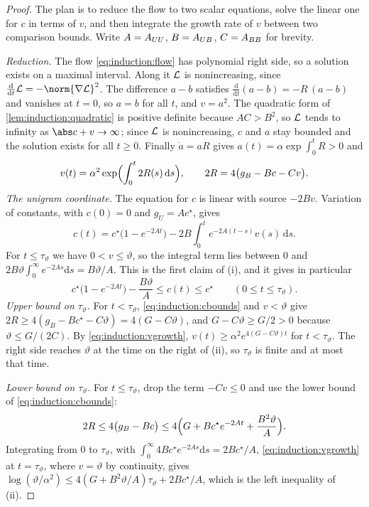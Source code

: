 \begin{refsection}
\begin{proof}
The plan is to reduce the flow to two scalar equations, solve the linear one for $c$ in terms of $v$, and then integrate the growth rate of $v$ between two comparison bounds. Write $A=A_{UU}$, $B=A_{UB}$, $C=A_{BB}$ for brevity.

\emph{Reduction.} The flow \eqref{eq:induction:flow} has polynomial right side, so a solution exists on a maximal interval. Along it $\mathcal{L}$ is nonincreasing, since $\frac{\mathrm d}{\mathrm dt}\Loss=-\norm{\nabla\Loss}^2$. The difference $a-b$ satisfies $\frac{\mathrm d}{\mathrm dt}(a-b)=-R\,(a-b)$ and vanishes at $t=0$, so $a=b$ for all $t$, and $v=a^2$. The quadratic form of \cref{lem:induction:quadratic} is positive definite because $AC>B^2$, so $\mathcal{L}$ tends to infinity as $\abs c+v\to\infty$; since $\mathcal{L}$ is nonincreasing, $c$ and $a$ stay bounded and the solution exists for all $t\ge0$. Finally $\dot a=aR$ gives $a(t)=\alpha\exp\int_0^tR>0$ and
\begin{equation}\label{eq:induction:vgrowth}
  v(t)=\alpha^2\exp\Bigl(\int_0^t2R(s)\,\mathrm ds\Bigr),\qquad 2R=4\bigl(g_B-Bc-Cv\bigr).
\end{equation}
\emph{The unigram coordinate.} The equation for $c$ is linear with source $-2Bv$. Variation of constants, with $c(0)=0$ and $g_U=Ac^\star$, gives
\begin{equation}\label{eq:induction:cformula}
  c(t)=c^\star\bigl(1-e^{-2At}\bigr)-2B\int_0^te^{-2A(t-s)}v(s)\,\mathrm ds .
\end{equation}
For $t\le\tau_\vartheta$ we have $0<v\le\vartheta$, so the integral term lies between $0$ and $2B\vartheta\int_0^\infty e^{-2As}\mathrm ds=B\vartheta/A$. This is the first claim of (i), and it gives in particular
\begin{equation}\label{eq:induction:cbounds}
  c^\star\bigl(1-e^{-2At}\bigr)-\frac{B\vartheta}A\le c(t)\le c^\star\qquad(0\le t\le\tau_\vartheta).
\end{equation}
\emph{Upper bound on $\tau_\vartheta$.} For $t<\tau_\vartheta$, \eqref{eq:induction:cbounds} and $v<\vartheta$ give $2R\ge4(g_B-Bc^\star-C\vartheta)=4(G-C\vartheta)$, and $G-C\vartheta\ge G/2>0$ because $\vartheta\le G/(2C)$. By \eqref{eq:induction:vgrowth}, $v(t)\ge\alpha^2e^{4(G-C\vartheta)t}$ for $t<\tau_\vartheta$. The right side reaches $\vartheta$ at the time on the right of (ii), so $\tau_\vartheta$ is finite and at most that time.

\emph{Lower bound on $\tau_\vartheta$.} For $t\le\tau_\vartheta$, drop the term $-Cv\le0$ and use the lower bound of \eqref{eq:induction:cbounds}:
\[
  2R\le4\bigl(g_B-Bc\bigr)\le4\Bigl(G+Bc^\star e^{-2At}+\frac{B^2\vartheta}A\Bigr).
\]
Integrating from $0$ to $\tau_\vartheta$, with $\int_0^\infty4Bc^\star e^{-2As}\mathrm ds=2Bc^\star/A$, \eqref{eq:induction:vgrowth} at $t=\tau_\vartheta$, where $v=\vartheta$ by continuity, gives $\log(\vartheta/\alpha^2)\le4(G+B^2\vartheta/A)\tau_\vartheta+2Bc^\star/A$, which is the left inequality of (ii).


\end{proof}
\end{refsection}
